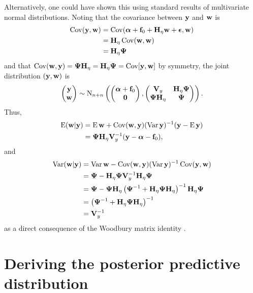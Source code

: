 Alternatively, one could have shown this using standard results of multivariate normal distributions.
Noting that the covariance between $\by$ and $\bw$ is  %
\begin{align*}
  \Cov(\by,\bw)
  &= \Cov(\balpha + \bff_0 + \bH_\eta\bw + \bepsilon, \bw) \\
  &= \bH_\eta\Cov(\bw,\bw) \\
  &= \bH_\eta\bPsi 
\end{align*}
and that $\Cov(\bw,\by) = \bPsi\bH_\eta = \bH_\eta\bPsi = \Cov[\by,\bw]$ by symmetry, the joint distribution $(\by,\bw)$ is
\[
  \begin{pmatrix}
    \by \\
    \bw
  \end{pmatrix}
  \sim \N_{n+n}
  \left(
    \begin{pmatrix}
      \balpha + \bff_0 \\
      \bzero
    \end{pmatrix},
    \begin{pmatrix}
      \bV_y         & \bH_\eta\bPsi \\
      \bPsi\bH_\eta & \bPsi \\
    \end{pmatrix}
  \right).
\] 
Thus,
\begin{align*}
  \E (\bw|\by)
  &= \E \bw + \Cov(\bw,\by) (\Var \by)^{-1} (\by - \E \by) \\
  &= \bPsi\bH_\eta\bV_y^{-1}(\by - \balpha - \bff_0),
\end{align*}
and
\begin{align*}
  \Var (\bw|\by)
  &= \Var \bw - \Cov(\bw,\by) (\Var \by)^{-1} \Cov(\by,\bw) \\
  &= \bPsi - \bH_\eta\bPsi\bV_y^{-1}\bH_\eta\bPsi \\
  &= \bPsi - \bPsi\bH_\eta \left(\bPsi^{-1} + \bH_\eta\bPsi\bH_\eta \right)^{-1}\bH_\eta\bPsi  \\
  &= \left(\bPsi^{-1} + \bH_\eta\bPsi\bH_\eta \right)^{-1} \\
  &= \bV_y^{-1}
\end{align*}
as a direct consequence of the Woodbury matrix identity \citep[eq. 156, sec. 3.2.2]{petersen2008matrix}.

\section{Deriving the posterior predictive distribution}
\label{apx:postpred}

